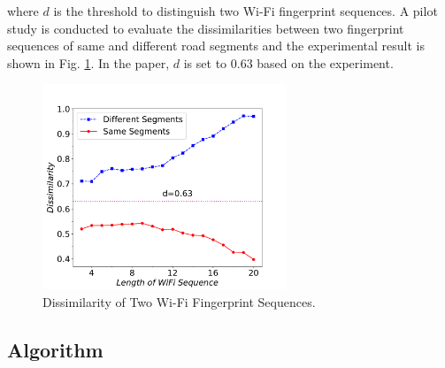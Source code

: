 \documentclass[conference]{IEEEtran}
\begin{document}
where $d$ is the threshold to distinguish two Wi-Fi fingerprint sequences. A pilot study is conducted to evaluate the dissimilarities between two fingerprint sequences of same and different road segments and the experimental result is shown in Fig. \ref{fig-wifidist}. In the paper, $d$ is set to $0.63$ based on the experiment. 

\begin{figure}[!htbp]
	\centering
		\includegraphics[width=2.88in]{AiFiMatch-WiFiDist}
		\caption{Dissimilarity of Two Wi-Fi Fingerprint Sequences.}
	\label{fig-wifidist}
\end{figure}

\subsection{Algorithm}
\end{document}
